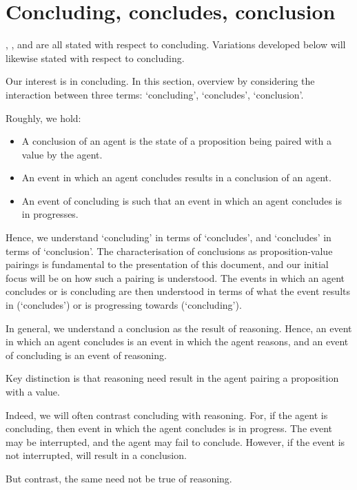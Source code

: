 \section{Concluding, concludes, conclusion}
\label{cha:introduction:sec:CCC}

\begin{note}
  \qWhy{}, \qHow{}, and \issueInclusion{} are all stated with respect to concluding.
  Variations developed below will likewise stated with respect to concluding.
\end{note}

\begin{note}
  Our interest is in concluding.
  In this section, overview by considering the interaction between three terms:
  `concluding', `concludes', `conclusion'.

  Roughly, we hold:

  \begin{itemize}
  \item
    A conclusion of an agent is the state of a proposition being paired with a value by the agent.
  \item
    An event in which an agent concludes results in a conclusion of an agent.
  \item
    An event of concluding is such that an event in which an agent concludes is in progresses.
  \end{itemize}

  Hence, we understand `concluding' in terms of `concludes', and `concludes' in terms of `conclusion'.
  The characterisation of conclusions as proposition-value pairings is fundamental to the presentation of this document, and our initial focus will be on how such a pairing is understood.
  The events in which an agent concludes or is concluding are then understood in terms of what the event results in (`concludes') or is progressing towards (`concluding').

  In general, we understand a conclusion as the result of reasoning.
  Hence, an event in which an agent concludes is an event in which the agent reasons, and an event of concluding is an event of reasoning.

  Key distinction is that reasoning need result in the agent pairing a proposition with a value.

  Indeed, we will often contrast concluding with reasoning.
  For, if the agent is concluding, then event in which the agent concludes is in progress.
  The event may be interrupted, and the agent may fail to conclude.
  However, if the event is not interrupted, will result in a conclusion.

  But contrast, the same need not be true of reasoning.
\end{note}

